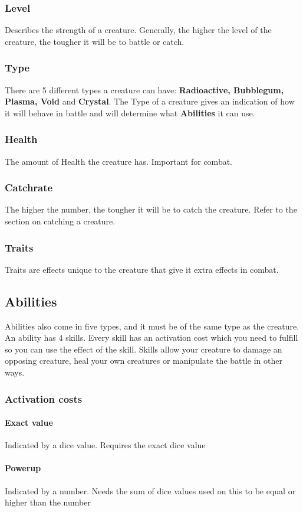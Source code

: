 \documentclass[a4paper,12pt]{article}
\begin{document}
\subsubsection{Level}
Describes the strength of a creature. Generally, the higher the level of the creature, the tougher it will be to battle or catch.
\subsubsection{Type}
There are 5 different types a creature can have:
\textbf{Radioactive, Bubblegum, Plasma, Void} and \textbf{Crystal}.
The Type of a creature gives an indication of how it will behave in 
battle and will determine what \textbf{Abilities} it can use.
\subsubsection{Health}
The amount of Health the creature has. Important for combat.
\subsubsection{Catchrate}
The higher the number, the tougher it will be to catch the creature.
Refer to the section on catching a creature.
\subsubsection{Traits}
Traits are effects unique to the creature that give it extra effects in combat. 
\subsection{Abilities}
Abilities also come in five types, and it must be of the same type as the creature.  
An ability has 4 skills.
Every skill has an activation cost which you need to fulfill so you can use the effect of the skill.
Skills allow your creature to damage an opposing creature, heal your own creatures or manipulate the battle in other ways. 
\subsubsection{Activation costs}
\paragraph{Exact value}
Indicated by a dice value. Requires the exact dice value
\paragraph{Powerup}
Indicated by a number. Needs the sum of dice values used on this to be equal or higher than the number
\end{document}
